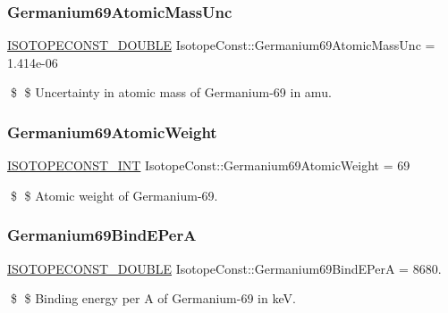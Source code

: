 \subsubsection{\texorpdfstring{Germanium69\+Atomic\+Mass\+Unc}{Germanium69AtomicMassUnc}}
{\footnotesize\ttfamily \mbox{\hyperlink{group___isotope_const-_macros_ga8f45a7272ce02c0b4c65c44636ed719a}{I\+S\+O\+T\+O\+P\+E\+C\+O\+N\+S\+T\+\_\+\+D\+O\+U\+B\+LE}} Isotope\+Const\+::\+Germanium69\+Atomic\+Mass\+Unc = 1.\+414e-\/06}

\$ \$ Uncertainty in atomic mass of Germanium-\/69 in amu. \mbox{\label{group___isotope_const-_germanium-_ge69_ga1f1afdd81c320a9a5b3c706e7493b7f1}} 
\subsubsection{\texorpdfstring{Germanium69\+Atomic\+Weight}{Germanium69AtomicWeight}}
{\footnotesize\ttfamily \mbox{\hyperlink{group___isotope_const-_macros_ga5f18360b3e99483a35c32d789e62621c}{I\+S\+O\+T\+O\+P\+E\+C\+O\+N\+S\+T\+\_\+\+I\+NT}} Isotope\+Const\+::\+Germanium69\+Atomic\+Weight = 69}

\$ \$ Atomic weight of Germanium-\/69. \mbox{\label{group___isotope_const-_germanium-_ge69_ga6b82a0d339d9165d62a53ce36e38e439}} 
\subsubsection{\texorpdfstring{Germanium69\+Bind\+E\+PerA}{Germanium69BindEPerA}}
{\footnotesize\ttfamily \mbox{\hyperlink{group___isotope_const-_macros_ga8f45a7272ce02c0b4c65c44636ed719a}{I\+S\+O\+T\+O\+P\+E\+C\+O\+N\+S\+T\+\_\+\+D\+O\+U\+B\+LE}} Isotope\+Const\+::\+Germanium69\+Bind\+E\+PerA = 8680.}

\$ \$ Binding energy per A of Germanium-\/69 in keV. \mbox{\label{group___isotope_const-_germanium-_ge69_ga1335918a5ef2cb0e3ac4001644a4e12c}} 
